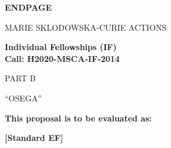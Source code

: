 \documentclass[a4paper,11pt]{article}
\newcommand{\acronym}{{\sc OSEGA}\xspace}
\begin{document}
\newpage
\vspace{15mm}
\begin{center}


        \Large{
      
     
        \textbf{ENDPAGE}
  
          \vspace{15mm}
          MARIE SKLODOWSKA-CURIE ACTIONS\\
          \vspace{1cm}
          
          \textbf{Individual Fellowships (IF)}\\
          \textbf{Call: H2020-MSCA-IF-2014}
          \vspace{2cm}                   

          PART B
          \vspace{2.5cm}

          ``\acronym''
          \vspace{2cm}

          \textbf{This proposal is to be evaluated as:}
          \vspace{.5cm}

          \textbf{[Standard EF]}
        }

  \end{center}
\vspace{1cm}
\end{document}
